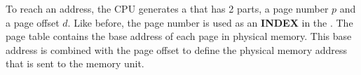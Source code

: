To reach an address, the CPU generates a  that has 2 parts, a page number $p$ and a page offset $d$.
Like before, the page number is used as an \textbf{INDEX} in the .
The page table contains the base address of each page in physical memory.
This base address is combined with the page offset to define the physical memory address that is sent to the memory unit.

